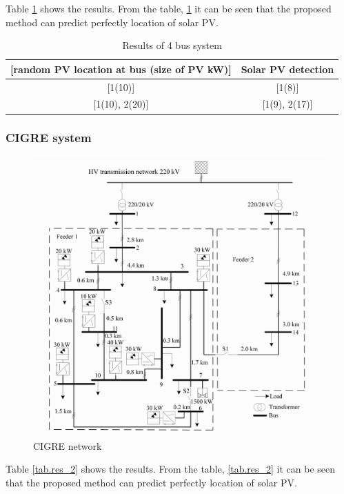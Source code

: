 Table \ref{tab.res_1} shows the results. From the table, \ref{tab.res_1} it can be seen that the proposed method can predict perfectly location of solar PV.

\begin{table}[h]
  \caption{Results of 4 bus system}
  \begin{tabular}{cc}
    \hline
  {[}random PV location at bus (size of PV kW){]} & Solar PV detection \\
  \hline
  {[}1(10){]}                                     & {[}1(8){]}         \\
  {[}1(10), 2(20){]}                              & {[}1(9), 2(17){]}\\
  \hline
  \end{tabular}
\label{tab.res_1}
\end{table}

\subsubsection{CIGRE system}



\begin{figure}[h!]
  \center
  \includegraphics[scale=0.25]{images/CIGRE_network.png}
  \caption{CIGRE network}
  \label{fig.CIGRE_network}
\end{figure}


Table \ref{tab.res_2} shows the results. From the table, \ref{tab.res_2} it can be seen that the proposed method can predict perfectly location of solar PV.

